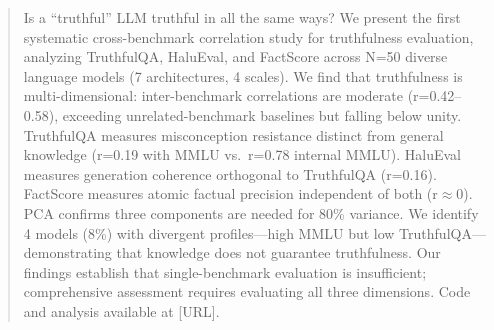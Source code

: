 \begin{abstract}
Is a ``truthful'' LLM truthful in all the same ways? We present the first systematic cross-benchmark correlation study for truthfulness evaluation, analyzing TruthfulQA, HaluEval, and FactScore across N=50 diverse language models (7 architectures, 4 scales). We find that truthfulness is multi-dimensional: inter-benchmark correlations are moderate (r=0.42--0.58), exceeding unrelated-benchmark baselines but falling below unity. TruthfulQA measures misconception resistance distinct from general knowledge (r=0.19 with MMLU vs.\ r=0.78 internal MMLU). HaluEval measures generation coherence orthogonal to TruthfulQA (r=0.16). FactScore measures atomic factual precision independent of both (r$\approx$0). PCA confirms three components are needed for 80\% variance. We identify 4 models (8\%) with divergent profiles---high MMLU but low TruthfulQA---demonstrating that knowledge does not guarantee truthfulness. Our findings establish that single-benchmark evaluation is insufficient; comprehensive assessment requires evaluating all three dimensions. Code and analysis available at [URL].
\end{abstract}
